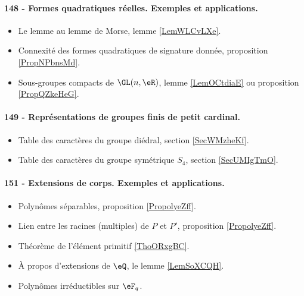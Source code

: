 \paragraph{148 - Formes quadratiques réelles. Exemples et applications.}
\begin{itemize}
    \item Le lemme au lemme de Morse, lemme \ref{LemWLCvLXe}.
    \item Connexité des formes quadratiques de signature donnée, proposition \ref{PropNPbnsMd}.
    \item Sous-groupes compacts de \( \GL(n,\eR)\), lemme \ref{LemOCtdiaE} ou proposition \ref{PropQZkeHeG}.
\end{itemize}
\paragraph{149 - Représentations de groupes finis de petit cardinal.}
\begin{itemize}
    \item Table des caractères du groupe diédral, section \ref{SecWMzheKf}.
    \item Table des caractères du groupe symétrique \( S_4\), section \ref{SecUMIgTmO}.
\end{itemize}
\paragraph{151 - Extensions de corps. Exemples et applications.}
\begin{itemize}
    \item Polynômes séparables, proposition \ref{PropolyeZff}.
    \item Lien entre les racines (multiples) de \( P\) et \( P'\), proposition \ref{PropolyeZff}.
    \item Théorème de l'élément primitif \ref{ThoORxgBC}.
    \item À propos d'extensions de \( \eQ\), le lemme \ref{LemSoXCQH}.
    \item Polynômes irréductibles sur \( \eF_q\).
\end{itemize}
